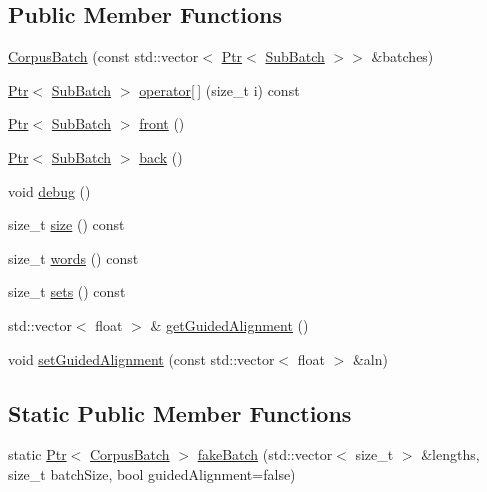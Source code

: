 \subsection*{Public Member Functions}
\begin{DoxyCompactItemize}
\item 
\hyperlink{classmarian_1_1data_1_1CorpusBatch_a061c24ff6677bc985119977455302560}{Corpus\+Batch} (const std\+::vector$<$ \hyperlink{namespacemarian_ad1a373be43a00ef9ce35666145137b08}{Ptr}$<$ \hyperlink{classmarian_1_1data_1_1SubBatch}{Sub\+Batch} $>$$>$ \&batches)
\item 
\hyperlink{namespacemarian_ad1a373be43a00ef9ce35666145137b08}{Ptr}$<$ \hyperlink{classmarian_1_1data_1_1SubBatch}{Sub\+Batch} $>$ \hyperlink{classmarian_1_1data_1_1CorpusBatch_a4f8369a19bc9c5ab917579c172c8bce0}{operator\mbox{[}$\,$\mbox{]}} (size\+\_\+t i) const 
\item 
\hyperlink{namespacemarian_ad1a373be43a00ef9ce35666145137b08}{Ptr}$<$ \hyperlink{classmarian_1_1data_1_1SubBatch}{Sub\+Batch} $>$ \hyperlink{classmarian_1_1data_1_1CorpusBatch_a47d93bc1eb7e2d660fe0de99156df6da}{front} ()
\item 
\hyperlink{namespacemarian_ad1a373be43a00ef9ce35666145137b08}{Ptr}$<$ \hyperlink{classmarian_1_1data_1_1SubBatch}{Sub\+Batch} $>$ \hyperlink{classmarian_1_1data_1_1CorpusBatch_a60afb153a0d6a3a9fe1405b4ecf99397}{back} ()
\item 
void \hyperlink{classmarian_1_1data_1_1CorpusBatch_ab56b678bb12703ee723949323370fd7f}{debug} ()
\item 
size\+\_\+t \hyperlink{classmarian_1_1data_1_1CorpusBatch_acabd255446e0d9b00214072ef3060117}{size} () const 
\item 
size\+\_\+t \hyperlink{classmarian_1_1data_1_1CorpusBatch_a5597c93166aaa6ed811d0b2df54b59b6}{words} () const 
\item 
size\+\_\+t \hyperlink{classmarian_1_1data_1_1CorpusBatch_afab056fc027340a6561619570c659048}{sets} () const 
\item 
std\+::vector$<$ float $>$ \& \hyperlink{classmarian_1_1data_1_1CorpusBatch_a7f9d07558336c3dc8854ee4b46ac51b7}{get\+Guided\+Alignment} ()
\item 
void \hyperlink{classmarian_1_1data_1_1CorpusBatch_a4d9d524bc2263aa45f5999d165832121}{set\+Guided\+Alignment} (const std\+::vector$<$ float $>$ \&aln)
\end{DoxyCompactItemize}
\subsection*{Static Public Member Functions}
\begin{DoxyCompactItemize}
\item 
static \hyperlink{namespacemarian_ad1a373be43a00ef9ce35666145137b08}{Ptr}$<$ \hyperlink{classmarian_1_1data_1_1CorpusBatch}{Corpus\+Batch} $>$ \hyperlink{classmarian_1_1data_1_1CorpusBatch_a076a85a873fbfd1b106cf8f8495b8a4e}{fake\+Batch} (std\+::vector$<$ size\+\_\+t $>$ \&lengths, size\+\_\+t batch\+Size, bool guided\+Alignment=false)
\end{DoxyCompactItemize}
